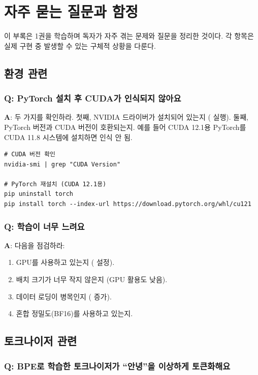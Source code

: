 \chapter{자주 묻는 질문과 함정}
\label{app:faq}

이 부록은 1권을 학습하며 독자가 자주 겪는 문제와 질문을 정리한 것이다. 각 항목은 실제 구현 중 발생할 수 있는 구체적 상황을 다룬다.

\section{환경 관련}

\subsection{Q: PyTorch 설치 후 CUDA가 인식되지 않아요}

\textbf{A}: 두 가지를 확인하라. 첫째, NVIDIA 드라이버가 설치되어 있는지 ( 실행). 둘째, PyTorch 버전과 CUDA 버전이 호환되는지. 예를 들어 CUDA 12.1용 PyTorch를 CUDA 11.8 시스템에 설치하면 인식 안 됨.

\begin{lstlisting}[style=bashstyle]
# CUDA 버전 확인
nvidia-smi | grep "CUDA Version"

# PyTorch 재설치 (CUDA 12.1용)
pip uninstall torch
pip install torch --index-url https://download.pytorch.org/whl/cu121
\end{lstlisting}

\subsection{Q: 학습이 너무 느려요}

\textbf{A}: 다음을 점검하라:
\begin{enumerate}
  \item GPU를 사용하고 있는지 ( 설정).
  \item 배치 크기가 너무 작지 않은지 (GPU 활용도 낮음).
  \item 데이터 로딩이 병목인지 ( 증가).
  \item 혼합 정밀도(BF16)를 사용하고 있는지.
\end{enumerate}

\section{토크나이저 관련}

\subsection{Q: BPE로 학습한 토크나이저가 ``안녕''을 이상하게 토큰화해요}

